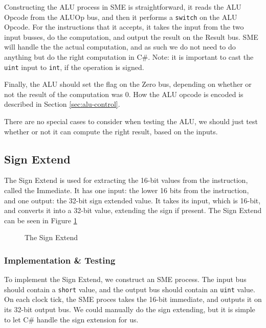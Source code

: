 Constructing the ALU process in SME is straightforward, it reads the ALU Opcode
from the ALUOp bus, and then it performs a \texttt{switch} on the ALU Opcode.
For the instructions that it accepts, it takes the input from the two input
busses, do the computation, and output the result on the Result bus. SME will
handle the the actual computation, and as such we do not need to do anything
but do the right computation in C\#. Note: it is important to cast the
\texttt{uint} input to \texttt{int}, if the operation is signed.

Finally, the ALU should set the flag on the Zero bus, depending on whether or
not the result of the computation was 0.  How the ALU opcode is encoded is
described in Section \ref{sec:alu-control}.

There are no special cases to consider when testing the ALU, we should just
test whether or not it can compute the right result, based on the inputs.

\subsection{Sign Extend}
The Sign Extend is used for extracting the 16-bit values from the instruction,
called the Immediate. It has one input: the lower 16 bits from the
instruction, and one output: the 32-bit sign extended value. It takes its
input, which is 16-bit, and converts it into a 32-bit value, extending the sign
if present. The Sign Extend can be seen in Figure \ref{fig:sign}

\begin{figure}
    \centering
    \caption{The Sign Extend}
    \label{fig:sign}
\end{figure}

\subsubsection*{Implementation \& Testing}
To implement the Sign Extend, we construct an SME process. The input bus should
contain a \texttt{short} value, and the output bus should contain an
\texttt{uint} value. On each clock tick, the SME proces takes the 16-bit
immediate, and outputs it on its 32-bit output bus. We could manually do the
sign extending, but it is simple to let C\# handle the sign extension for us.

